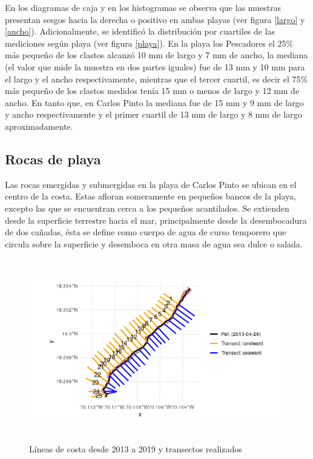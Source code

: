\documentclass[11pt,]{article}
\begin{document}
En los diagramas de caja y en los histogramas se observa que las
muestras presentan sesgos hacia la derecha o positivo en ambas playas
(ver figura \ref{largo} y \ref{ancho}). Adicionalmente, se identificó la
distribución por cuartiles de las mediciones según playa (ver figura
\ref{playa}). En la playa los Pescadores el 25\% más pequeño de los
clastos alcanzó 10 mm de largo y 7 mm de ancho, la mediana (el valor que
mide la muestra en dos partes iguales) fue de 13 mm y 10 mm para el
largo y el ancho respectivamente, mientras que el tercer cuartil, es
decir el 75\% más pequeño de los clastos medidos tenía 15 mm o menos de
largo y 12 mm de ancho. En tanto que, en Carlos Pinto la mediana fue de
15 mm y 9 mm de largo y ancho respectivamente y el primer cuartil de 13
mm de largo y 8 mm de largo aproximadamente.

\subsection{Rocas de playa}\label{rocas-de-playa}

Las rocas emergidas y submergidas en la playa de Carlos Pinto se ubican
en el centro de la costa. Estas afloran someramente en pequeños bancos
de la playa, excepto las que se encuentran cerca a los pequeños
acantilados. Se extienden desde la superficie terrestre hacia el mar,
principalmente desde la desembocadura de dos cañadas, ésta se define
como cuerpo de agua de curso temporero que circula sobre la superficie y
desemboca en otra masa de agua sea dulce o salada.

\begin{figure}
\centering
\includegraphics[height=3.12500in]{transect_linea_R.png}
\caption{Líneas de costa desde 2013 a 2019 y transectos
realizados\label{lineas}}
\end{figure}
\end{document}
